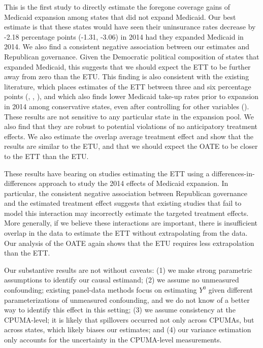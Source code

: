 \documentclass[12pt]{article}
\begin{document}
This is the first study to directly estimate the foregone coverage gains of Medicaid expansion among states that did not expand Medicaid. Our best estimate is that these states would have seen their uninsurance rates decrease by -2.18 percentage points (-1.31, -3.06) in 2014 had they expanded Medicaid in 2014. We also find a consistent negative association between our estimates and Republican governance. Given the Democratic political composition of states that expanded Medicaid, this suggests that we should expect the ETT to be further away from zero than the ETU. This finding is also consistent with the existing literature, which places estimates of the ETT between three and six percentage points (\cite{kaestner2017effects}, \cite{courtemanche2017early}, \cite{frean2017premium}), and which also finds lower Medicaid take-up rates prior to expansion in 2014 among conservative states, even after controlling for other variables (\cite{sommers2012understanding}). These results are not sensitive to any particular state in the expansion pool. We also find that they are robust to potential violations of no anticipatory treatment effects. We also estimate the overlap average treatment effect and show that the results are similar to the ETU, and that we should expect the OATE to be closer to the ETT than the ETU.

These results have bearing on studies estimating the ETT using a differences-in-differences approach to study the 2014 effects of Medicaid expansion. In particular, the consistent negative association between Republican governance and the estimated treatment effect suggests that existing studies that fail to model this interaction may incorrectly estimate the targeted treatment effects. More generally, if we believe these interactions are important, there is insufficient overlap in the data to estimate the ETT without extrapolating from the data. Our analysis of the OATE again shows that the ETU requires less extrapolation than the ETT.

Our substantive results are not without caveats: (1) we make strong parametric assumptions to identify our causal estimand; (2) we assume no unmeasured confounding; existing panel-data methods focus on estimating $Y^0$ given different parameterizations of unmeasured confounding, and we do not know of a better way to identify this effect in this setting; (3) we assume consistency at the CPUMA-level; it is likely that spillovers occurred not only across CPUMAs, but across states, which likely biases our estimates; and (4) our variance estimation only accounts for the uncertainty in the CPUMA-level measurements. 
\end{document}
